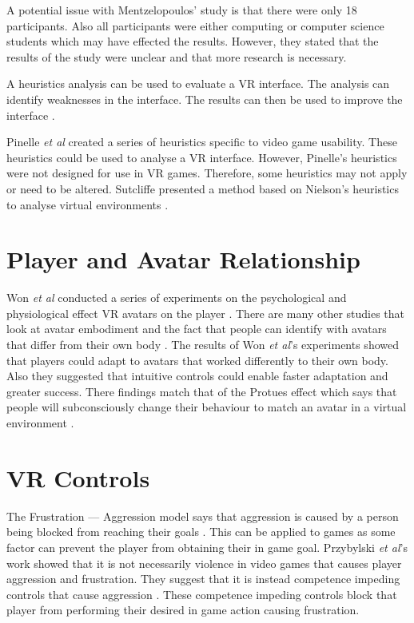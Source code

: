 \documentclass{scrartcl}
\begin{document}
\bigskip  

A potential issue with Mentzelopoulos' study is that there were only 18 participants. Also all participants were either computing or computer science students which may have effected the results\cite{Mentzelopoulos}. However, they stated that the results of the study were unclear and that more research is necessary.

\bigskip 
 
A heuristics analysis can be used to evaluate a VR interface.  The analysis can identify weaknesses in the interface. The results can then be used to improve the interface \cite{Nielsen, Pinelle}.


Pinelle \textit{et al} created a series of heuristics specific to video game usability. These heuristics could be used to analyse a VR interface. However, Pinelle's heuristics were not designed for use in VR games.  Therefore, some heuristics may not apply or need to be altered.  Sutcliffe presented a method based on Nielson's heuristics to analyse virtual environments \cite{sutcliffe2004heuristic}.

\section{Player and Avatar Relationship}
Won \textit{et al} conducted a series of experiments on the psychological and physiological effect VR avatars on the player \cite{won2015homuncular}. There are many other studies that look at avatar embodiment and the fact that people can identify with avatars that differ from their own body \cite{Groen, Latoschik}. The results of Won \textit{et al}'s experiments showed that players could adapt to avatars that worked differently to their own body. Also they suggested that intuitive controls could enable faster adaptation and greater success. There findings match that of the Protues effect which says that people will subconsciously change their behaviour to match an avatar in a virtual environment \cite{won2015homuncular, yee2007proteus}.


\section{VR Controls}
The Frustration --- Aggression model says that aggression is caused by a person being blocked from reaching their goals \cite{dollard1939frustration}.  This can be applied to games as some factor can prevent the player from obtaining their in game goal.  Przybylski \textit{et al}'s work showed that it is not necessarily violence in video games that causes player aggression and frustration. They suggest that it is instead competence impeding controls that cause aggression \cite{przybylski, przybylski2010motivational}. These competence impeding controls block that player from performing their desired in game action causing frustration. 
\end{document}
